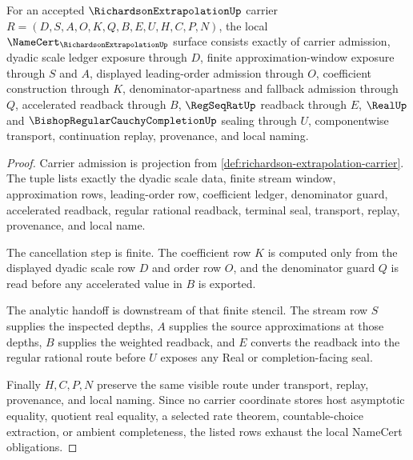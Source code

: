 \begin{theorem}
\label{thm:richardson-extrapolation-namecert-obligations}
For an accepted $\RichardsonExtrapolationUp$ carrier $R=(D,S,A,O,K,Q,B,E,U,H,C,P,N)$, the local $\NameCert_{\RichardsonExtrapolationUp}$ surface consists exactly of carrier admission, dyadic scale ledger exposure through $D$, finite approximation-window exposure through $S$ and $A$, displayed leading-order admission through $O$, coefficient construction through $K$, denominator-apartness and fallback admission through $Q$, accelerated readback through $B$, $\RegSeqRatUp$ readback through $E$, $\RealUp$ and $\BishopRegularCauchyCompletionUp$ sealing through $U$, componentwise transport, continuation replay, provenance, and local naming.
\end{theorem}
\begin{proof}
Carrier admission is projection from \autoref{def:richardson-extrapolation-carrier}. The tuple lists exactly the dyadic scale data, finite stream window, approximation rows, leading-order row, coefficient ledger, denominator guard, accelerated readback, regular rational readback, terminal seal, transport, replay, provenance, and local name.

The cancellation step is finite. The coefficient row $K$ is computed only from the displayed dyadic scale row $D$ and order row $O$, and the denominator guard $Q$ is read before any accelerated value in $B$ is exported.

The analytic handoff is downstream of that finite stencil. The stream row $S$ supplies the inspected depths, $A$ supplies the source approximations at those depths, $B$ supplies the weighted readback, and $E$ converts the readback into the regular rational route before $U$ exposes any Real or completion-facing seal.

Finally $H,C,P,N$ preserve the same visible route under transport, replay, provenance, and local naming. Since no carrier coordinate stores host asymptotic equality, quotient real equality, a selected rate theorem, countable-choice extraction, or ambient completeness, the listed rows exhaust the local NameCert obligations.
\end{proof}

